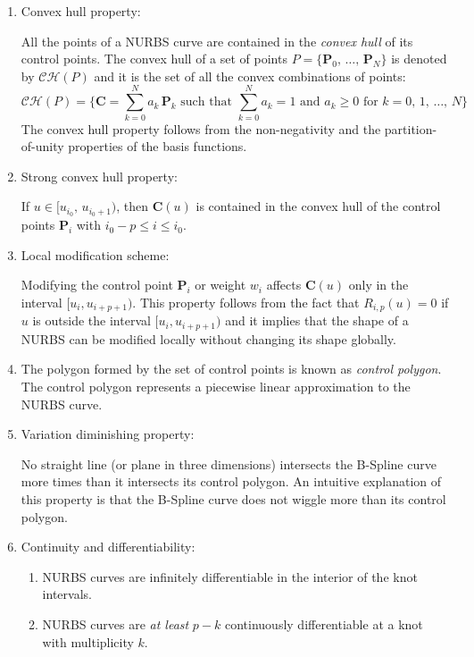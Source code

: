 \begin{enumerate}
    \item Convex hull property:
    
    All the points of a NURBS curve are contained in the \textit{convex hull} of its control points.
    The convex hull of a set of points $P = \{\mathbf{P}_{0},\, \dots,\, \mathbf{P}_{N}\}$ is denoted by $\mathcal{CH}(P)$ and it is the set of all the convex combinations of points:
    \begin{equation*}
     \mathcal{CH}(P) = \Big\{ \mathbf{C} =  \sum_{k=0}^{N} a_{k} \, \mathbf{P}_{k} \text{ such that } \sum_{k=0}^{N} a_{k} = 1 \text{ and } a_{k}\geq 0 \text{ for } k = 0,\, 1,\, \dots,\, N\Big\}
    \end{equation*}
    The convex hull property follows from the non-negativity and the partition-of-unity properties of the basis functions.
    
    \item Strong convex hull property:
    
    If $u \in [u_{i_{0}},\, u_{i_{0}+1})$, then $\mathbf{C}(u)$ is contained in the convex hull of the control points $\boldsymbol{P}_{i}$ with $i_{0}-p \leq i \leq i_{0}$.

    \item Local modification scheme:
    
    Modifying the control point $\mathbf{P}_{i}$ or weight $w_{i}$ affects $\mathbf{C}(u)$ only in the interval $[u_{i}, u_{i+p+1})$. This property follows from the fact that $R_{i,p}(u)=0$ if $u$ is outside the interval $[u_{i}, u_{i+p+1})$ and it implies that the shape of a NURBS can be modified locally without changing its shape globally.
    
    \item The polygon formed by the set of control points is known as \textit{control polygon}. The control polygon represents a piecewise linear approximation to the NURBS curve.

    \item Variation diminishing property:
    
    No straight line (or plane in three dimensions) intersects the B-Spline curve more times than it intersects its control polygon. An intuitive explanation of this property is that the B-Spline curve does not wiggle more than its control polygon.
    
    \item Continuity and differentiability:
    \begin{enumerate}
        \item NURBS curves are infinitely differentiable in the interior of the knot intervals.
        \item NURBS curves are \textit{at least} $p-k$ continuously differentiable at a knot with multiplicity $k$.
    \end{enumerate}
    

\end{enumerate}
